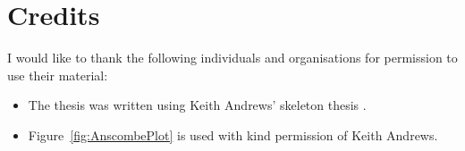 \chapter*{Credits}

I would like to thank the following individuals and organisations for
permission to use their material:
\begin{itemize}
\item The thesis was written using Keith Andrews' skeleton thesis
  \parencite{KeithThesis}.

\item Figure~\ref{fig:AnscombePlot} is used with kind permission
  of Keith Andrews.
\end{itemize}



